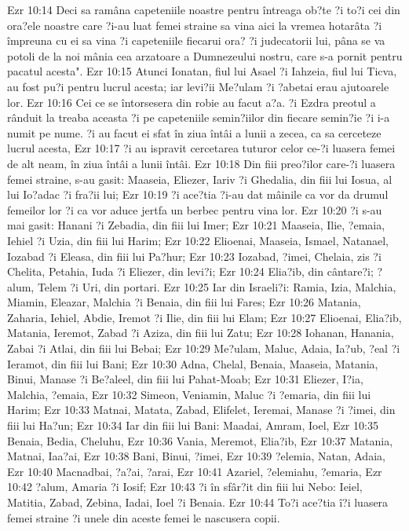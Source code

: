 Ezr 10:14  Deci sa ramâna capeteniile noastre pentru întreaga ob?te ?i to?i cei din ora?ele noastre care ?i-au luat femei straine sa vina aici la vremea hotarâta ?i împreuna cu ei sa vina ?i capeteniile fiecarui ora? ?i judecatorii lui, pâna se va potoli de la noi mânia cea arzatoare a Dumnezeului nostru, care s-a pornit pentru pacatul acesta".
Ezr 10:15  Atunci Ionatan, fiul lui Asael ?i Iahzeia, fiul lui Ticva, au fost pu?i pentru lucrul acesta; iar levi?ii Me?ulam ?i ?abetai erau ajutoarele lor.
Ezr 10:16  Cei ce se întorsesera din robie au facut a?a. ?i Ezdra preotul a rânduit la treaba aceasta ?i pe capeteniile semin?iilor din fiecare semin?ie ?i i-a numit pe nume. ?i au facut ei sfat în ziua întâi a lunii a zecea, ca sa cerceteze lucrul acesta,
Ezr 10:17  ?i au ispravit cercetarea tuturor celor ce-?i luasera femei de alt neam, în ziua întâi a lunii întâi.
Ezr 10:18  Din fiii preo?ilor care-?i luasera femei straine, s-au gasit: Maaseia, Eliezer, Iariv ?i Ghedalia, din fiii lui Iosua, al lui Io?adac ?i fra?ii lui;
Ezr 10:19  ?i ace?tia ?i-au dat mâinile ca vor da drumul femeilor lor ?i ca vor aduce jertfa un berbec pentru vina lor.
Ezr 10:20  ?i s-au mai gasit: Hanani ?i Zebadia, din fiii lui Imer;
Ezr 10:21  Maaseia, Ilie, ?emaia, Iehiel ?i Uzia, din fiii lui Harim;
Ezr 10:22  Elioenai, Maaseia, Ismael, Natanael, Iozabad ?i Eleasa, din fiii lui Pa?hur;
Ezr 10:23  Iozabad, ?imei, Chelaia, zis ?i Chelita, Petahia, Iuda ?i Eliezer, din levi?i;
Ezr 10:24  Elia?ib, din cântare?i; ?alum, Telem ?i Uri, din portari.
Ezr 10:25  Iar din Israeli?i: Ramia, Izia, Malchia, Miamin, Eleazar, Malchia ?i Benaia, din fiii lui Fares;
Ezr 10:26  Matania, Zaharia, Iehiel, Abdie, Iremot ?i Ilie, din fiii lui Elam;
Ezr 10:27  Elioenai, Elia?ib, Matania, Ieremot, Zabad ?i Aziza, din fiii lui Zatu;
Ezr 10:28  Iohanan, Hanania, Zabai ?i Atlai, din fiii lui Bebai;
Ezr 10:29  Me?ulam, Maluc, Adaia, Ia?ub, ?eal ?i Ieramot, din fiii lui Bani;
Ezr 10:30  Adna, Chelal, Benaia, Maaseia, Matania, Binui, Manase ?i Be?aleel, din fiii lui Pahat-Moab;
Ezr 10:31  Eliezer, I?ia, Malchia, ?emaia,
Ezr 10:32  Simeon, Veniamin, Maluc ?i ?emaria, din fiii lui Harim;
Ezr 10:33  Matnai, Matata, Zabad, Elifelet, Ieremai, Manase ?i ?imei, din fiii lui Ha?un;
Ezr 10:34  Iar din fiii lui Bani: Maadai, Amram, Ioel,
Ezr 10:35  Benaia, Bedia, Cheluhu,
Ezr 10:36  Vania, Meremot, Elia?ib,
Ezr 10:37  Matania, Matnai, Iaa?ai,
Ezr 10:38  Bani, Binui, ?imei,
Ezr 10:39  ?elemia, Natan, Adaia,
Ezr 10:40  Macnadbai, ?a?ai, ?arai,
Ezr 10:41  Azariel, ?elemiahu, ?emaria,
Ezr 10:42  ?alum, Amaria ?i Iosif;
Ezr 10:43  ?i în sfâr?it din fiii lui Nebo: Ieiel, Matitia, Zabad, Zebina, Iadai, Ioel ?i Benaia.
Ezr 10:44  To?i ace?tia î?i luasera femei straine ?i unele din aceste femei le nascusera copii.


